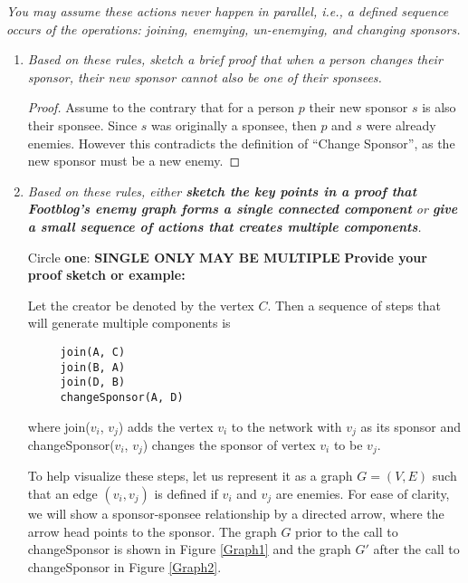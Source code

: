 \documentclass[11pt, oneside]{article}   	%
\theoremstyle{definition}
\theoremstyle{remark}
\begin{document}
\textit{You may assume these actions never happen in parallel, i.e., a defined sequence occurs of the operations: joining, enemying, un-enemying, and changing sponsors.}
\begin{enumerate}
	\item \textit{Based on these rules, sketch a brief proof that when a person changes their sponsor, their new sponsor cannot also be one of their sponsees.}
	
	\begin{proof}
		Assume to the contrary that for a person $p$ their new sponsor $s$ is also their sponsee. Since $s$ was originally a sponsee, then $p$ and $s$ were already enemies. However this contradicts the definition of ``Change Sponsor'', as the new sponsor must be a new enemy.
	\end{proof}		
	
	\item \textit{Based on these rules, either \textbf{sketch the key points in a proof that    Footblog's enemy graph forms a single connected component} or \textbf{give a small sequence of actions that creates multiple components}.}
   
   Circle \textbf{one}: \hfill \textbf{SINGLE ONLY} \hfill \textbf{MAY BE MULTIPLE} \hfill
   \textbf{Provide your proof sketch or example:}
   
   Let the creator be denoted by the vertex $C$. Then a sequence of steps that will generate multiple components is
   \begin{verbatim}
     join(A, C)
     join(B, A)
     join(D, B)
     changeSponsor(A, D)
   \end{verbatim}
   where join($v_i$, $v_j$) adds the vertex $v_i$ to the network with $v_j$ as its sponsor and changeSponsor($v_i$, $v_j$) changes the sponsor of vertex $v_i$ to be $v_j$.
   
   
   To help visualize these steps, let us represent it as a graph $G=(V,E)$ such that an edge $(v_i, v_j)$ is defined if $v_i$ and $v_j$ are enemies. For ease of clarity, we will show a sponsor-sponsee relationship by a directed arrow, where the arrow head points to the sponsor. The graph $G$ prior to the call to changeSponsor is shown in Figure \ref{Graph1} and the graph $G'$ after the call to changeSponsor in Figure \ref{Graph2}.
   
   \begin{figure}[h]           
   	\centering
    \begin{subfigure}[b]{0.45\columnwidth}
    		\centering
\end{subfigure}
\end{figure}
\end{enumerate}
\end{document}
